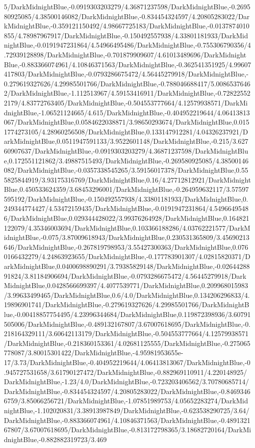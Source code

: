 {\begin{tikzternal}
5/DarkMidnightBlue,-0.0919303203279/4.36871237598/DarkMidnightBlue,-0.269580925085/4.38500146082/DarkMidnightBlue,-0.834454324597/4.20805283022/DarkMidnightBlue,-0.359121150492/4.98667725183/DarkMidnightBlue,-0.0137874010855/4.78987967917/DarkMidnightBlue,-0.150492557938/4.33801181933/DarkMidnightBlue,-0.0191947231864/4.54966495486/DarkMidnightBlue,-0.755306790356/4.72939128898/DarkMidnightBlue,-0.701879909607/4.61013489696/DarkMidnightBlue,-0.883366074961/4.10846371563/DarkMidnightBlue,-0.362541351925/4.99607417803/DarkMidnightBlue,-0.0793286675472/4.56445279918/DarkMidnightBlue,-0.279619327626/4.29985501766/DarkMidnightBlue,-0.788046688417/5.00865376462/DarkMidnightBlue,-1.112513967/4.59153416911/DarkMidnightBlue,-0.728225522179/4.83772763405/DarkMidnightBlue,-0.504553777664/4.12579938571/DarkMidnightBlue,-1.06521124665/4.615/DarkMidnightBlue,-0.404952219644/4.06413813067/DarkMidnightBlue,0.0584622038871/3.98650293674/DarkMidnightBlue,0.0151774273105/4.28960256508/DarkMidnightBlue,0.133147912281/4.04326237921/DarkMidnightBlue,0.0511947591133/3.9522601148/DarkMidnightBlue,-0.215/3.62760907637/DarkMidnightBlue,-0.0919303203279/4.36871237598/DarkMidnightBlue,0.172551121862/3.49887515493/DarkMidnightBlue,-0.269580925085/4.38500146082/DarkMidnightBlue,-0.0357338545265/3.59156017378/DarkMidnightBlue,0.555825844919/3.93175316769/DarkMidnightBlue,0.16/4.27712812921/DarkMidnightBlue,0.450533624359/3.68453296001/DarkMidnightBlue,-0.264959632117/3.57597595192/DarkMidnightBlue,-0.150492557938/4.33801181933/DarkMidnightBlue,0.249344774427/4.53472159435/DarkMidnightBlue,-0.0191947231864/4.54966495486/DarkMidnightBlue,0.029344428022/3.99376264928/DarkMidnightBlue,0.164821122079/4.35346003694/DarkMidnightBlue,0.103366188286/4.03762221577/DarkMidnightBlue,-0.075/3.87009618943/DarkMidnightBlue,0.230531365809/3.45690213646/DarkMidnightBlue,-0.267819798953/3.55427300363/DarkMidnightBlue,0.0760166432279/4.24863923655/DarkMidnightBlue,-0.177783901307/4.02815820371/DarkMidnightBlue,0.0400698890291/3.79385829148/DarkMidnightBlue,-0.0264428891824/3.81184906694/DarkMidnightBlue,-0.0793286675472/4.56445279918/DarkMidnightBlue,0.0428566699397/4.4077539771/DarkMidnightBlue,0.209968015983/3.99633499465/DarkMidnightBlue,0.6/4.0/DarkMidnightBlue,0.134206296833/4.19896901741/DarkMidnightBlue,-0.279619327626/4.29985501766/DarkMidnightBlue,-0.00418857754495/4.23996344684/DarkMidnightBlue,0.119872398936/3.60791505006/DarkMidnightBlue,-0.489132167807/3.67007618695/DarkMidnightBlue,-0.218164329111/3.60642113179/DarkMidnightBlue,-0.504553777664/4.12579938571/DarkMidnightBlue,-0.218360153361/4.02681125555/DarkMidnightBlue,-0.275065778087/3.80015301422/DarkMidnightBlue,-4.95981953655e-17/3.73/DarkMidnightBlue,-0.404952219644/4.06413813067/DarkMidnightBlue,-0.945727531658/3.61790127472/DarkMidnightBlue,-0.882969110911/4.220148925/DarkMidnightBlue,-1.23/4.0/DarkMidnightBlue,-0.723203406562/3.70780685714/DarkMidnightBlue,-0.834454324597/4.20805283022/DarkMidnightBlue,-0.84693466759/3.85066256721/DarkMidnightBlue,-1.07851989753/4.05652283274/DarkMidnightBlue,-1.102020831/3.38913987849/DarkMidnightBlue,-0.623538290725/3.64/DarkMidnightBlue,-0.883366074961/4.10846371563/DarkMidnightBlue,-0.489132167807/3.67007618695/DarkMidnightBlue,-0.813172798365/3.18682720164/DarkMidnightBlue,-0.882882319723/3.469
\end{tikzternal}}
